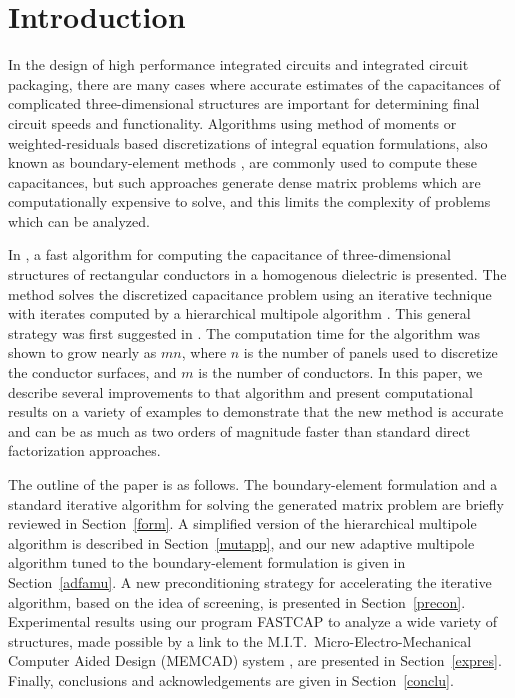 \section{Introduction}

In the design of high performance integrated circuits and integrated
circuit packaging, there are many cases where accurate estimates of
the capacitances of complicated three-dimensional structures are
important for determining final circuit speeds and functionality.
Algorithms using method of moments \cite{harrin68}
or weighted-residuals \cite{cranda56,collat66} 
based discretizations of
integral equation formulations,
also known as boundary-element methods \cite{brebbi84}, are commonly used to
compute these capacitances, but such approaches generate dense
matrix problems which are computationally expensive to solve,
and this limits the complexity of problems which can be analyzed.

In \cite{nabors91}, a fast algorithm for computing the capacitance of
three-dimensional structures of rectangular conductors in a homogenous
dielectric is presented.  The method solves the discretized capacitance
problem using an iterative technique with iterates computed by
a hierarchical multipole algorithm \cite{greeng87,greeng88}. This
general strategy was first suggested in \cite{rokhli85}.
The computation time for the algorithm was shown to grow nearly as $ mn$, 
where $ n $ is the
number of panels used to discretize the conductor surfaces, and $ m $
is the number of conductors.  In this paper, we describe several
improvements to that algorithm and present computational results on a
variety of examples to demonstrate that the new method is accurate and
can be as much as two orders of magnitude faster than standard
direct factorization approaches.

The outline of the paper is as follows.  The boundary-element
formulation and a standard iterative algorithm for solving the
generated matrix problem are briefly reviewed in Section~\ref{form}. A
simplified version of the hierarchical multipole algorithm is described
in Section~\ref{mutapp}, and our new adaptive multipole algorithm tuned to the
boundary-element formulation is given in Section~\ref{adfamu}.  A new
preconditioning strategy for accelerating the iterative algorithm,
based on the idea of screening, is presented in Section~\ref{precon}.
Experimental results using our program FASTCAP to analyze a wide
variety of structures, made possible by a link to the M.I.T.\
Micro-Electro-Mechanical Computer Aided Design (MEMCAD) system \cite{maseeh90},
are presented in Section~\ref{expres}.  
Finally, conclusions and acknowledgements
are given in Section~\ref{conclu}.

